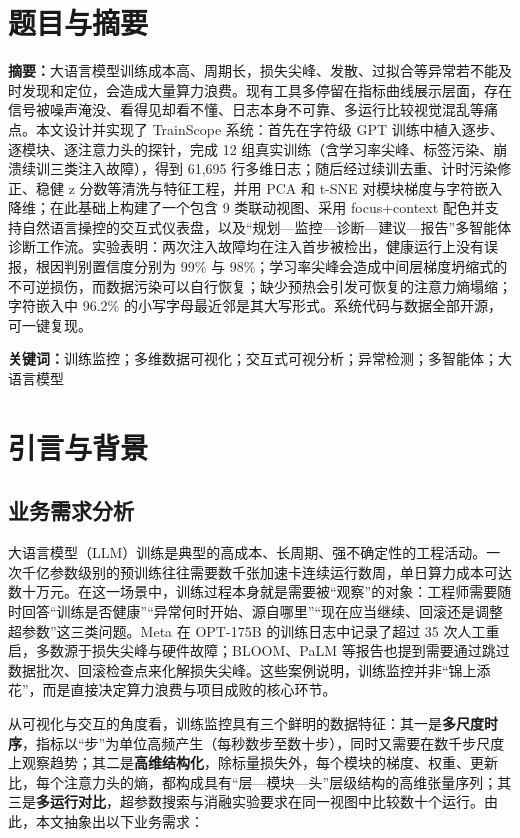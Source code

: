 \section{题目与摘要}
\begin{abstractbox}
\noindent\textbf{\heiti 摘\quad 要：}大语言模型训练成本高、周期长，损失尖峰、发散、过拟合等异常若不能及时发现和定位，会造成大量算力浪费。现有工具多停留在指标曲线展示层面，存在信号被噪声淹没、看得见却看不懂、日志本身不可靠、多运行比较视觉混乱等痛点。本文设计并实现了 TrainScope 系统：首先在字符级 GPT 训练中植入逐步、逐模块、逐注意力头的探针，完成 12 组真实训练（含学习率尖峰、标签污染、崩溃续训三类注入故障），得到 61,695 行多维日志；随后经过续训去重、计时污染修正、稳健 z 分数等清洗与特征工程，并用 PCA 和 t-SNE 对模块梯度与字符嵌入降维；在此基础上构建了一个包含 9 类联动视图、采用 focus+context 配色并支持自然语言操控的交互式仪表盘，以及“规划—监控—诊断—建议—报告”多智能体诊断工作流。实验表明：两次注入故障均在注入首步被检出，健康运行上没有误报，根因判别置信度分别为 99\% 与 98\%；学习率尖峰会造成中间层梯度坍缩式的不可逆损伤，而数据污染可以自行恢复；缺少预热会引发可恢复的注意力熵塌缩；字符嵌入中 96.2\% 的小写字母最近邻是其大写形式。系统代码与数据全部开源，可一键复现。

\vspace{0.5em}\noindent\textbf{\heiti 关键词：}训练监控；多维数据可视化；交互式可视分析；异常检测；多智能体；大语言模型
\end{abstractbox}

\section{引言与背景}

\subsection{业务需求分析}

大语言模型（LLM）训练是典型的高成本、长周期、强不确定性的工程活动。一次千亿参数级别的预训练往往需要数千张加速卡连续运行数周，单日算力成本可达数十万元。在这一场景中，训练过程本身就是需要被“观察”的对象：工程师需要随时回答“训练是否健康”“异常何时开始、源自哪里”“现在应当继续、回滚还是调整超参数”这三类问题。Meta 在 OPT-175B 的训练日志中记录了超过 35 次人工重启，多数源于损失尖峰与硬件故障\cite{r1}；BLOOM、PaLM 等报告也提到需要通过跳过数据批次、回滚检查点来化解损失尖峰\cite{r2,r3}。这些案例说明，训练监控并非“锦上添花”，而是直接决定算力浪费与项目成败的核心环节。

从可视化与交互的角度看，训练监控具有三个鲜明的数据特征：其一是\textbf{多尺度时序}，指标以“步”为单位高频产生（每秒数步至数十步），同时又需要在数千步尺度上观察趋势；其二是\textbf{高维结构化}，除标量损失外，每个模块的梯度、权重、更新比，每个注意力头的熵，都构成具有“层—模块—头”层级结构的高维张量序列；其三是\textbf{多运行对比}，超参数搜索与消融实验要求在同一视图中比较数十个运行。由此，本文抽象出以下业务需求：

